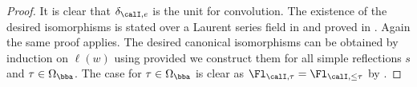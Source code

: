 \documentclass[10pt, reqno]{amsart}
\theoremstyle{plain}
\theoremstyle{definition}
\numberwithin{equation}{section}
\begin{document}
	\begin{proof}
		It is clear that $\delta_{\calI,e}$ is the unit for convolution.%
		The existence of the desired isomorphisms is stated over a Laurent series field in \cite[Lemma 8(a)]{AB09} and proved in \cite[Lemma 4.1.4(3)]{AR}. Again the same proof applies. The desired canonical isomorphisms can be obtained by induction on $\ell(w)$ using  provided we construct them for all simple reflections $s$ and $\tau\in \Omega_{\bba}$. The case for $\tau\in \Omega_\bba$ is clear as $\Fl_{\calI,\tau}=\Fl_{\calI,\leq \tau}$ by .
		

\end{proof}
\end{document}
